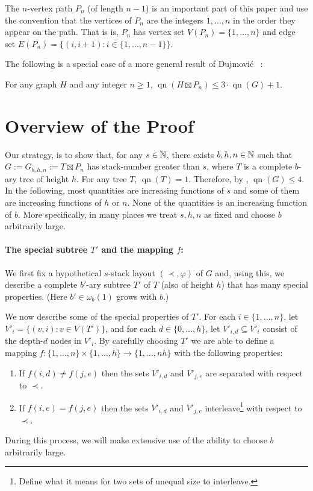 \documentclass[kpfonts]{patmorin}
\DeclareMathOperator{\qn}{qn}
\begin{document}
The $n$-vertex path $P_n$ (of length $n-1$) is an important part of this paper and use the convention that the vertices of $P_n$ are the integers $1,\ldots,n$ in the order they appear on the path. That is is, $P_n$ has vertex set $V(P_n)=\{1,\ldots,n\}$ and edge set $E(P_n)=\{(i,i+1):i\in\{1,\ldots,n-1\}\}$.

The following is a special case of a more general result of Dujmović \etal~\cite[Lemma~8]{XXX}:

\begin{cor}
  For any graph $H$ and any integer $n\ge 1$, $\qn(H\boxtimes P_n)\le 3\cdot\qn(G)+1$. 
\end{cor}

\section{Overview of the Proof}

Our strategy, is to show that, for any $s\in\mathbb{N}$, there exists $b,h,n\in\mathbb{N}$ such that $G:=G_{b,h,n}:=T\boxtimes P_n$ has stack-number greater than $s$, where $T$ is a complete $b$-ary tree of height $h$. For any tree $T$, $\qn(T)=1$.  Therefore, by , $\qn(G)\le 4$.  In the following, most quantities are increasing functions of $s$ and some of them are increasing functions of $h$ or $n$.  None of the quantities is an increasing function of $b$.  More specifically, in many places we treat $s,h,n$ as fixed and choose $b$ arbitrarily large.

\paragraph{The special subtree $T'$ and the mapping $f$:}
We first fix a hypothetical $s$-stack layout $(\prec,\varphi)$ of $G$ and, using this, we describe a complete $b'$-ary subtree $T'$ of $T$ (also of height $h$) that has many special properties.  (Here $b'\in\omega_b(1)$ grows with $b$.)  

We now describe some of the special properties of $T'$.  For each $i\in\{1,\ldots,n\}$, let $V'_i=\{(v,i):v\in V(T')\}$, and for each $d\in\{0,\ldots,h\}$, let $V'_{i,d}\subseteq V'_i$ consist of the depth-$d$ nodes in $V'_i$. By carefully choosing $T'$ we are able to define a mapping $f:\{1,\ldots,n\}\times \{1,\ldots,h\}\to \{1,\ldots,nh\}$ with the following properties:
\begin{enumerate}
  \item If $f(i,d)\neq f(j,e)$ then the sets $V'_{i,d}$ and $V'_{j,e}$ are separated with respect to $\prec$.
  \item If $f(i,e)= f(j,e)$ then the sets $V'_{i,d}$ and $V'_{j,e}$ interleave\footnote{Define what it means for two sets of unequal size to interleave.} with respect to $\prec$.
\end{enumerate}
During this process, we will make extensive use of the ability to choose $b$ arbitrarily large. 
\end{document}
